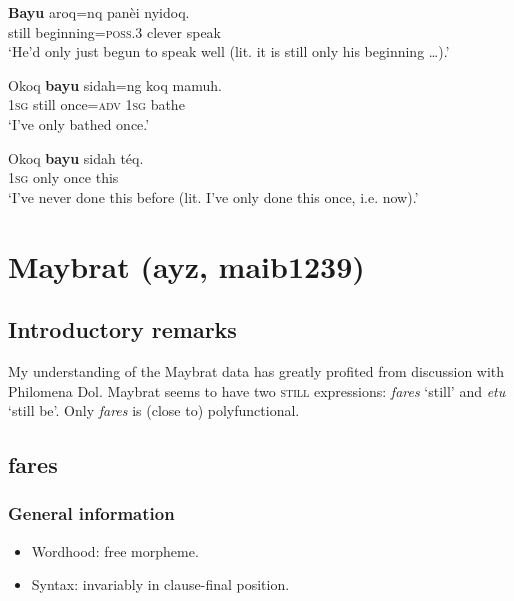 \begin{exe}
	\ex \label{exAppendixMateqRestrictive1}
	\gll \textbf{Bayu} aroq=nq panèi nyidoq.\\
	still beginning=\textsc{poss}.3 clever speak\\
	\glt \lq He'd only just begun to speak well (lit. it is still only his beginning …).' \parencite[138]{Connell2013}	

	\ex\label{exAppendixMateqRestrictive2}
	\gll Okoq \textbf{bayu} sidah=ng koq mamuh.\\
	1\textsc{sg} still once=\textsc{adv} 1\textsc{sg} bathe\\
	\glt \lq I've only bathed once.'  \parencite[150]{Connell2013}
	
	\ex\label{exAppendixMateqRestrictive3}
	\gll Okoq \textbf{bayu} sidah téq.\\
	1\textsc{sg} only once this\\
	\glt \lq I've never done this before (lit. I've only done this once, i.e. now).' \parencite[150]{Connell2013}
\end{exe}

\section{Maybrat (ayz, maib1239)}
\label{appendixMaybrat}
\subsection{Introductory remarks}
My understanding of the Maybrat data has greatly profited from discussion with Philomena Dol. Maybrat seems to have two \textsc{still} expressions: \textit{fares} \lq still' and \textit{etu} \lq still be'. Only \textit{fares} is (close to) polyfunctional.

\subsection{fares}

\subsubsection{General information}
\begin{itemize}
	\item Wordhood: free morpheme.
	\item Syntax: invariably in clause-final position.
\end{itemize}

